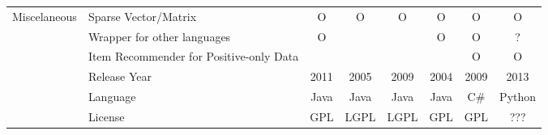{\begin{tabular}{c|l|cccccc}
    \multirow{6}{*}{Miscelaneous}        &Sparse Vector/Matrix&O&O&O&O&O&O\\
                                         &Wrapper for other languages&O&&&O&O&?\\
                                         &Item Recommender for Positive-only Data&&&&&O&O\\
                                         &Release Year&2011&2005&2009&2004&2009&2013\\
                                         &Language&Java&Java&Java&Java&C\#&Python\\
                                         &License&GPL&LGPL&LGPL&GPL&GPL&???\\ \bottomrule
    
\end{tabular}}
